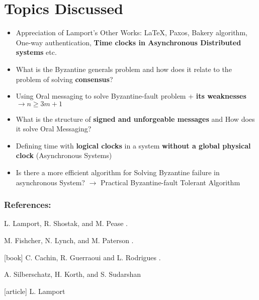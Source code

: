 \documentclass[handout]{beamer}
\begin{document}
\section{Topics Discussed}
\begin{frame}{\insertsection}
	\begin{itemize}
		\item <+-> Appreciation of Lamport's Other Works: \LaTeX, Paxos, Bakery algorithm, One-way authentication,\textbf{ Time clocks in Asynchronous Distributed systems} etc.
		\item<+-> What is the Byzantine generals problem and how does it relate to the problem of solving \textbf{consensus}? 
		\item<+-> Using Oral messaging to solve Byzantine-fault problem + \textbf{its weaknesses}$\rightarrow n \ge 3m+1$ 
		\item<+-> What is the structure of \textbf{signed and unforgeable messages} and How does it solve Oral Messaging?
		\item<+-> Defining time with \textbf{logical clocks} in a system \textbf{without a global physical clock} (Asynchronous Systems)
		\item<+-> Is there a more efficient algorithm for Solving Byzantine failure in asynchronous System? $\rightarrow$ Practical Byzantine-fault Tolerant Algorithm
	\end{itemize}
\end{frame}


\begin{frame}
	\frametitle{References:}
\begin{thebibliography}{10}
	\footnotesize
	\alert{L. Lamport, R. Shostak, and M. Pease}
	.
	
	\alert{M. Fishcher, N. Lynch, and M. Paterson}
	.
	
	[book]
	\alert{C. Cachin, R. Guerraoui and L. Rodrigues}
	.
	
	\alert{A. Silberschatz, H. Korth, and S. Sudarshan}
	
	[article]
	\alert{L. Lamport}
\end{thebibliography}
\end{frame}
\end{document}
